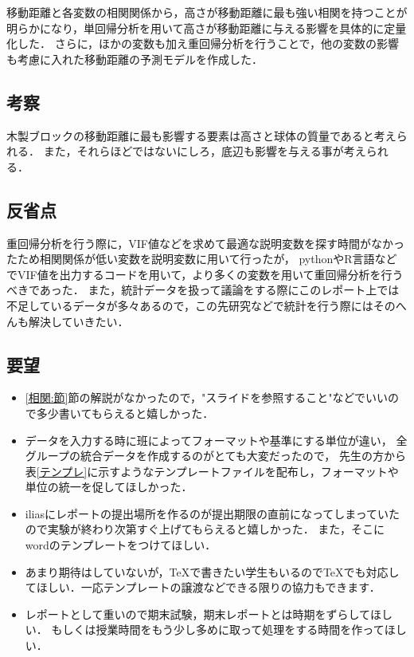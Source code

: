 \documentclass[titlepage,a4paper]{jsarticle}
\begin{document}
移動距離と各変数の相関関係から，高さが移動距離に最も強い相関を持つことが明らかになり，単回帰分析を用いて高さが移動距離に与える影響を具体的に定量化した．
さらに，ほかの変数も加え重回帰分析を行うことで，他の変数の影響も考慮に入れた移動距離の予測モデルを作成した．
\subsection{考察}
木製ブロックの移動距離に最も影響する要素は高さと球体の質量であると考えられる．
また，それらほどではないにしろ，底辺も影響を与える事が考えられる．
\subsection{反省点}
重回帰分析を行う際に，VIF値などを求めて最適な説明変数を探す時間がなかったため相関関係が低い変数を説明変数に用いて行ったが，
pythonやR言語などでVIF値を出力するコードを用いて，より多くの変数を用いて重回帰分析を行うべきであった．
また，統計データを扱って議論をする際にこのレポート上では不足しているデータが多々あるので，この先研究などで統計を行う際にはそのへんも解決していきたい．
\subsection{要望}
\begin{itemize}
  \item \ref{相関:節}節の解説がなかったので，"スライドを参照すること"などでいいので多少書いてもらえると嬉しかった．
  \item データを入力する時に班によってフォーマットや基準にする単位が違い，
        全グループの統合データを作成するのがとても大変だったので，
        先生の方から表\ref{テンプレ}に示すようなテンプレートファイルを配布し，フォーマットや単位の統一を促してほしかった．
  \item iliasにレポートの提出場所を作るのが提出期限の直前になってしまっていたので実験が終わり次第すぐ上げてもらえると嬉しかった．
        また，そこにwordのテンプレートをつけてほしい．
  \item あまり期待はしていないが，TeXで書きたい学生もいるのでTeXでも対応してほしい．一応テンプレートの譲渡などできる限りの協力もできます．
  \item レポートとして重いので期末試験，期末レポートとは時期をずらしてほしい．
        もしくは授業時間をもう少し多めに取って処理をする時間を作ってほしい．
\end{itemize}
\end{document}
